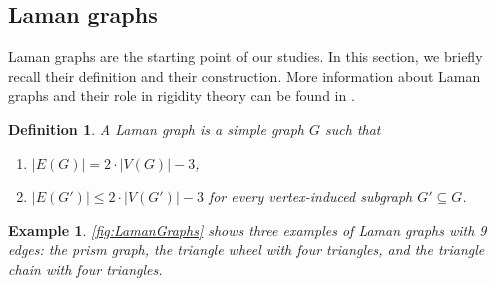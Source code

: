 \documentclass[11pt,reqno,a4paper]{amsart}
\theoremstyle{theoremstyle}
\theoremstyle{examplestyle}
\newtheorem{example}[theorem]{Example}
\newtheorem{definition}[theorem]{Definition}
\theoremstyle{algorithmstyle}
\begin{document}
\subsection{Laman graphs}
Laman graphs are the starting point of our studies.  In this section, we briefly recall their definition and their construction.  More information about Laman graphs and their role in rigidity theory can be found in \cite{SitharamJohnSidman2018}.

\begin{definition}
  \label{def:LamanGraphs}
  A \emph{Laman graph} is a simple graph $G$ such that
  \begin{enumerate}
  \item $|E(G)|=2\cdot |V(G)|-3$,
  \item $|E(G')|\leq 2\cdot |V(G')|-3$ for every vertex-induced subgraph $G'\subseteq G$.
  \end{enumerate}
\end{definition}

\begin{example}
  \label{ex:LamanGraphs}
  \cref{fig:LamanGraphs} shows three examples of Laman graphs with 9 edges: the prism graph, the triangle wheel with four triangles, and the triangle chain with four triangles.
\end{example}
\end{document}
